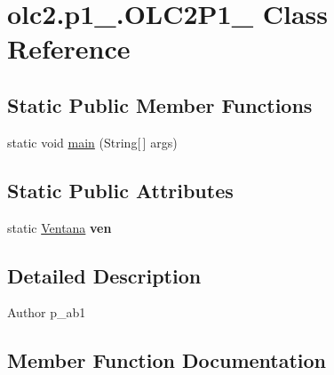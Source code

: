 \hypertarget{classolc2_1_1p1__201504242_1_1_o_l_c2_p1__201504242}{}\section{olc2.\+p1\+\_.\+O\+L\+C2\+P1\+\_ Class Reference}
\label{classolc2_1_1p1__201504242_1_1_o_l_c2_p1__201504242}
\subsection*{Static Public Member Functions}
\begin{DoxyCompactItemize}
\item 
static void \mbox{\hyperlink{classolc2_1_1p1__201504242_1_1_o_l_c2_p1__201504242_a5bf79504e3877c2dc8715e2e690b9653}{main}} (String\mbox{[}$\,$\mbox{]} args)
\end{DoxyCompactItemize}
\subsection*{Static Public Attributes}
\begin{DoxyCompactItemize}
\item 
\mbox{\label{classolc2_1_1p1__201504242_1_1_o_l_c2_p1__201504242_a21bf22cd1c336781d9102e71dc31be9b}} 
static \mbox{\hyperlink{classolc2_1_1p1__201504242_1_1_ventana}{Ventana}} {\bfseries ven}
\end{DoxyCompactItemize}


\subsection{Detailed Description}
\begin{DoxyAuthor}{Author}
p\+\_\+ab1 
\end{DoxyAuthor}


\subsection{Member Function Documentation}
\mbox{\label{classolc2_1_1p1__201504242_1_1_o_l_c2_p1__201504242_a5bf79504e3877c2dc8715e2e690b9653}} 
